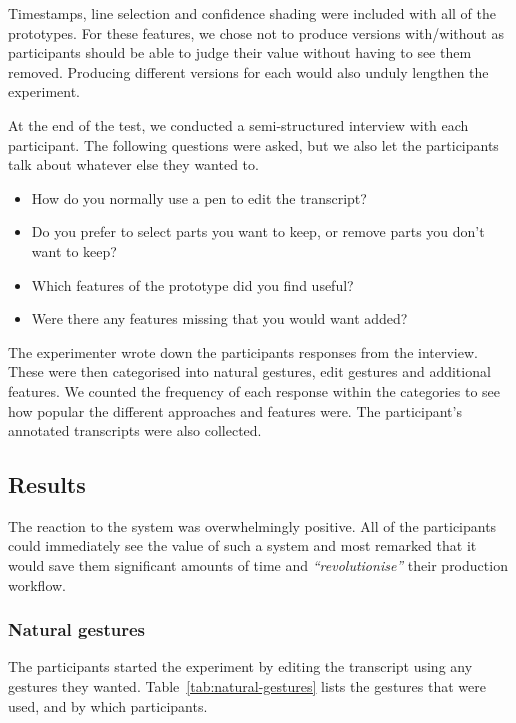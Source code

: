Timestamps, line selection and confidence shading were included with all of the prototypes. For these features, we
chose not to produce versions with/without as participants should be able to judge their value without having to see
them removed. Producing different versions for each would also unduly lengthen the experiment.

At the end of the test, we conducted a semi-structured interview with each participant. The following questions were
asked, but we also let the participants talk about whatever else they wanted to.

{\singlespacing
\begin{itemize}
  \item How do you normally use a pen to edit the transcript?
  \item Do you prefer to select parts you want to keep, or remove parts you don't want to keep?
  \item Which features of the prototype did you find useful?
  \item Were there any features missing that you would want added?
\end{itemize}
}

The experimenter wrote down the participants responses from the interview. These were then categorised into natural
gestures, edit gestures and additional features. We counted the frequency of each response within the categories to
see how popular the different approaches and features were. The participant's annotated transcripts were also
collected.

\subsection{Results}
The reaction to the system was overwhelmingly positive. All of the participants could immediately see the value of such
a system and most remarked that it would save them significant amounts of time and \textit{``revolutionise''} their
production workflow.

\subsubsection{Natural gestures}

The participants started the experiment by editing the transcript using any gestures they wanted.
Table~\ref{tab:natural-gestures} lists the gestures that were used, and by which participants.

